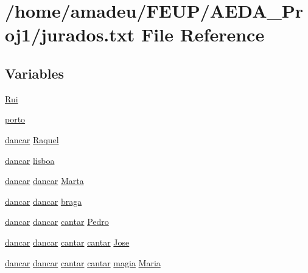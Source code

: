 \hypertarget{jurados_8txt}{}\section{/home/amadeu/\+F\+E\+U\+P/\+A\+E\+D\+A\+\_\+\+Proj1/jurados.txt File Reference}
\label{jurados_8txt}
\subsection*{Variables}
\begin{DoxyCompactItemize}
\item 
\hyperlink{jurados_8txt_afae26757e6180cef120017b01ac06140}{Rui}
\item 
\hyperlink{jurados_8txt_a50f37943ca5db274938bcee517a283cc}{porto}
\item 
\hyperlink{sessoes_8txt_a7649ba4017592bd762abe5b976e6481e}{dancar} \hyperlink{jurados_8txt_a3df76ea828422a61d89bb908cc76c7e0}{Raquel}
\item 
\hyperlink{sessoes_8txt_a7649ba4017592bd762abe5b976e6481e}{dancar} \hyperlink{jurados_8txt_afcb0be523bb30dc71d43c136869e3683}{lisboa}
\item 
\hyperlink{sessoes_8txt_a7649ba4017592bd762abe5b976e6481e}{dancar} \hyperlink{sessoes_8txt_a7649ba4017592bd762abe5b976e6481e}{dancar} \hyperlink{jurados_8txt_acaa9f92805c68fb12566e1910b1f38cc}{Marta}
\item 
\hyperlink{sessoes_8txt_a7649ba4017592bd762abe5b976e6481e}{dancar} \hyperlink{sessoes_8txt_a7649ba4017592bd762abe5b976e6481e}{dancar} \hyperlink{jurados_8txt_acb9307bae8c337dfbd877babfe36f1ad}{braga}
\item 
\hyperlink{sessoes_8txt_a7649ba4017592bd762abe5b976e6481e}{dancar} \hyperlink{sessoes_8txt_a7649ba4017592bd762abe5b976e6481e}{dancar} \hyperlink{sessoes_8txt_a2616159a76d0e8a5493734758ae9c160}{cantar} \hyperlink{jurados_8txt_af78ef3d9a9c21ea40fb35f0daf236401}{Pedro}
\item 
\hyperlink{sessoes_8txt_a7649ba4017592bd762abe5b976e6481e}{dancar} \hyperlink{sessoes_8txt_a7649ba4017592bd762abe5b976e6481e}{dancar} \hyperlink{sessoes_8txt_a2616159a76d0e8a5493734758ae9c160}{cantar} \hyperlink{sessoes_8txt_a2616159a76d0e8a5493734758ae9c160}{cantar} \hyperlink{jurados_8txt_ab580858c63900240ff0ab5fcc967078b}{Jose}
\item 
\hyperlink{sessoes_8txt_a7649ba4017592bd762abe5b976e6481e}{dancar} \hyperlink{sessoes_8txt_a7649ba4017592bd762abe5b976e6481e}{dancar} \hyperlink{sessoes_8txt_a2616159a76d0e8a5493734758ae9c160}{cantar} \hyperlink{sessoes_8txt_a2616159a76d0e8a5493734758ae9c160}{cantar} \hyperlink{sessoes_8txt_adb78776c95ad5bfba2eb9fce119157de}{magia} \hyperlink{jurados_8txt_a0b2ef1b8d2f47dfcb6f1424b0fd423be}{Maria}

\end{DoxyCompactItemize}
